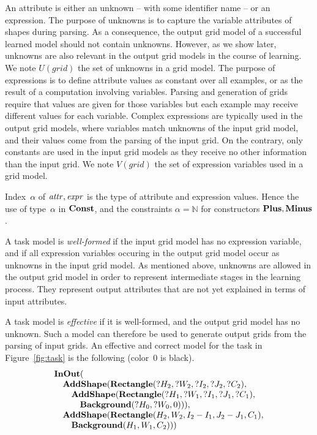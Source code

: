 \documentclass[a4paper]{llncs}
\newcommand{\nat}{\mathbb{N}}
\begin{document}
An attribute is either an unknown -- with some identifier name -- or
an expression. The purpose of unknowns is to capture the variable
attributes of shapes during parsing. As a consequence, the output grid
model of a successful learned model should not contain
unknowns. However, as we show later, unknowns are also relevant in the
output grid models in the course of learning. We note $U(grid)$ the
set of unknowns in a grid model.
%
The purpose of expressions is to define attribute values as constant
over all examples, or as the result of a computation involving
variables. Parsing and generation of grids require that values are
given for those variables but each example may receive different
values for each variable. Complex expressions are typically used in
the output grid models, where variables match unknowns of the input
grid model, and their values come from the parsing of the input
grid. On the contrary, only constants are used in the input grid
models as they receive no other information than the input grid.  We
note $V(grid)$ the set of expression variables used in a grid model.

Index~$\alpha$ of ${\it attr}, {\it expr}$ is the type of attribute
and expression values. Hence the use of type~$\alpha$ in
${\bf Const}$, and the constraints $\alpha = \nat$ for constructors
${\bf Plus}, {\bf Minus}$.

A task model is {\em well-formed} if the input grid model has no
expression variable, and if all expression variables occuring in the
output grid model occur as unknowns in the input grid model. As
mentioned above, unknowns are allowed in the output grid model in
order to represent intermediate stages in the learning process. They
represent output attributes that are not yet explained in terms of
input attributes.

A task model is {\em effective} if it is well-formed, and the output
grid model has no unknown. Such a model can therefore be used to
generate output grids from the parsing of input grids. An effective
and correct model for the task in Figure~\ref{fig:task} is the
following (color~0 is black).
\[\begin{array}{l}
{\bf InOut}( \\
\quad {\bf AddShape}({\bf Rectangle}(?H_2,?W_2,?I_2,?J_2,?C_2), \\
\quad \quad {\bf AddShape}({\bf Rectangle}(?H_1,?W_1,?I_1,?J_1,?C_1), \\
\quad \quad \quad {\bf Background}(?H_0,?W_0,0))), \\
\quad {\bf AddShape}({\bf Rectangle}(H_2,W_2,I_2-I_1,J_2-J_1,C_1), \\
\quad \quad  {\bf Background}(H_1,W_1,C_2))) \\
\end{array}\]
\end{document}
